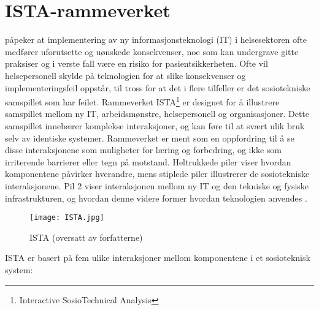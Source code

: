 \section{ISTA-rammeverket}
\label{sec:ista-rammeverket}

\citet{Harrison} påpeker at implementering av ny informasjonsteknologi (IT) i helsesektoren ofte medfører uforutsette og uønskede konsekvenser, noe som kan undergrave gitte praksiser og i verste fall være en risiko for pasientsikkerheten. Ofte vil helsepersonell skylde på teknologien for at slike konsekvenser og implementeringsfeil oppstår, til tross for at det i flere tilfeller er det sosiotekniske samspillet som har feilet. Rammeverket ISTA\footnote{Interactive SosioTechnical Analysis} er designet for å illustrere samspillet mellom ny IT, arbeidsmønstre, helsepersonell og organisasjoner. Dette samspillet innebærer komplekse interaksjoner, og kan føre til at svært ulik bruk selv av identiske systemer. Rammeverket er ment som en oppfordring til å se disse interaksjonene som muligheter for læring og forbedring, og ikke som irriterende barrierer eller tegn på motstand. Heltrukkede piler viser hvordan komponentene påvirker hverandre, mens stiplede piler illustrerer de sosiotekniske interaksjonene. Pil 2 viser interaksjonen mellom ny IT og den tekniske og fysiske infrastrukturen, og hvordan denne videre former hvordan teknologien anvendes \citep{Harrison}.

\begin{figure}[H]
\centering
\texttt{[image: ISTA.jpg]}
\caption{ISTA \citep{Harrison} (oversatt av forfatterne)}
\label{fig:ISTA}
\end{figure}

\noindent
ISTA er basert på fem ulike interaksjoner mellom komponentene i et sosioteknisk system:  

